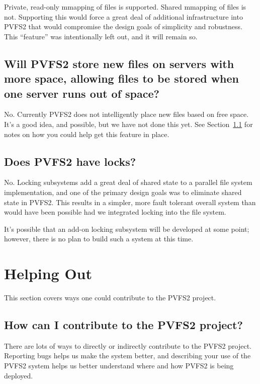 \documentclass[11pt,letterpaper]{article}
\begin{document}
Private, read-only mmapping of files is supported.  Shared mmapping of files
is not.  Supporting this would force a great deal of additional infrastructure
into PVFS2 that would compromise the design goals of simplicity and
robustness.  This ``feature'' was intentionally left out, and it will remain
so.

\subsection{Will PVFS2 store new files on servers with more space, allowing
            files to be stored when one server runs out of space?}

No.  Currently PVFS2 does not intelligently place new files based on free
space.  It's a good idea, and possible, but we have not done this yet.  See
Section~\ref{sec:contributing} for notes on how you could help get this
feature in place.

\subsection{Does PVFS2 have locks?}

No.  Locking subsystems add a great deal of shared state to a parallel file 
system implementation, and one of the primary design goals was to eliminate
shared state in PVFS2.  This results in a simpler, more fault tolerant
overall system than would have been possible had we integrated locking into
the file system.

It's possible that an add-on locking subsystem will be developed at some point;
however, there is no plan to build such a system at this time.

%
%
\section{Helping Out}

This section covers ways one could contribute to the PVFS2 project.

\subsection{How can I contribute to the PVFS2 project?}
\label{sec:contributing}

There are lots of ways to directly or indirectly contribute to the PVFS2
project.  Reporting bugs helps us make the system better, and describing your
use of the PVFS2 system helps us better understand where and how PVFS2 is
being deployed.
\end{document}
